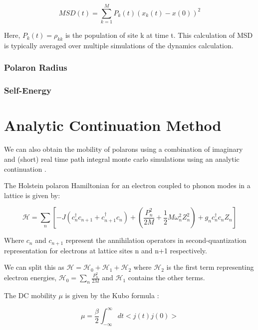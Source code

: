 \begin{equation}
    MSD(t) = \sum_{k=1}^{M} P_{k}(t) (x_{k}(t) - x(0))^2
\end{equation}

Here, $P_k(t) = \rho_{kk}$ is the population of site k at time t. This calculation of MSD is typically averaged over multiple simulations of the dynamics calculation.

\subsubsection{Polaron Radius}

\subsubsection{Self-Energy}

\section{Analytic Continuation Method}

We can also obtain the mobility of polarons using a combination of imaginary and (short) real time path integral monte carlo simulations using an analytic continuation \cite{miladic2023method}. 

 The Holstein polaron Hamiltonian for an electron coupled to phonon modes in a lattice is given by:

 \begin{equation}
    \mathcal{H} = \sum_n [-J(c_n^{\dag} c_{n+1} + c_{n+1}^{\dag}c_{n}) + (\frac{P_n^{2}}{2M} + \frac{1}{2}M\omega_n^{2} Z_{n}^{2}) + g_n c_n^{\dag}c_n Z_n]
 \end{equation}

 Where $c_n$ and $c_{n+1}$ represent the annihilation operators in second-quantization representation for electrons at lattice sites n and n+1 respectively.

 We can split this as $\mathcal{H} = \mathcal{H}_0 + \mathcal{H}_1 + \mathcal{H}_2$ where $\mathcal{H}_2$ is the first term representing electron energies, $\mathcal{H}_0 = \sum_n \frac{P_n^2}{2M}$ and $\mathcal{H}_1$ contains the other terms.

 The DC mobility $\mu$ is given by the Kubo formula :

 \begin{equation}
    \mu = \frac{\beta}{2} \int_{-\infty}^{\infty} dt<j(t)j(0)>
 \end{equation}

